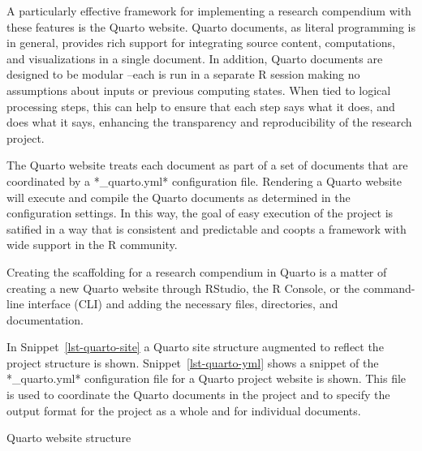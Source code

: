 \documentclass[
  letterpaper,
]{latex/krantz}
\theoremstyle{definition}
\theoremstyle{remark}
\begin{document}
A particularly effective framework for implementing a research
compendium with these features is the Quarto website. Quarto documents,
as literal programming is in general, provides rich support for
integrating source content, computations, and visualizations in a single
document. In addition, Quarto documents are designed to be modular
--each is run in a separate R session making no assumptions about inputs
or previous computing states. When tied to logical processing steps,
this can help to ensure that each step says what it does, and does what
it says, enhancing the transparency and reproducibility of the research
project.

The Quarto website treats each document as part of a set of documents
that are coordinated by a *\_quarto.yml* configuration file. Rendering a
Quarto website will execute and compile the Quarto documents as
determined in the configuration settings. In this way, the goal of easy
execution of the project is satified in a way that is consistent and
predictable and coopts a framework with wide support in the R community.

Creating the scaffolding for a research compendium in Quarto is a matter
of creating a new Quarto website through RStudio, the R Console, or the
command-line interface (CLI) and adding the necessary files,
directories, and documentation.

In Snippet~\ref{lst-quarto-site} a Quarto site structure augmented to
reflect the project structure is shown. Snippet~\ref{lst-quarto-yml}
shows a snippet of the *\_quarto.yml* configuration file for a Quarto
project website is shown. This file is used to coordinate the Quarto
documents in the project and to specify the output format for the
project as a whole and for individual documents.

\begin{codelisting}

\caption{\label{lst-quarto-site}Quarto website structure}


\end{codelisting}%
\end{document}
